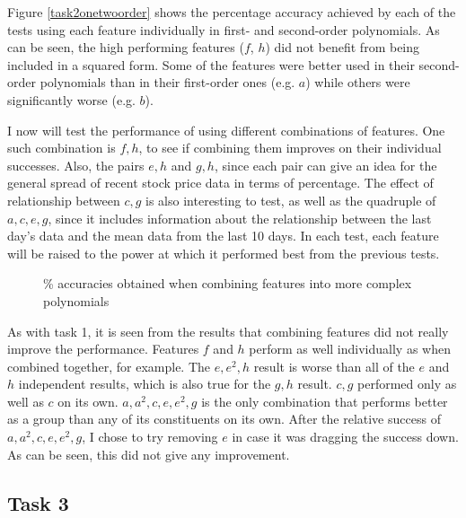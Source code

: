 \documentclass[a4paper,11pt]{article}
\begin{document}
Figure \ref{task2onetwoorder} shows the percentage accuracy achieved by each of the tests using each feature individually in first- and second-order polynomials.  As can be seen, the high performing features ($f$, $h$) did not benefit from being included in a squared form.  Some of the features were better used in their second-order polynomials than in their first-order ones (e.g. $a$) while others were significantly worse (e.g. $b$).

I now will test the performance of using different combinations of features.  One such combination is $f,h$, to see if combining them improves on their individual successes.  Also, the pairs $e,h$ and $g,h$, since each pair can give an idea for the general spread of recent stock price data in terms of percentage.  The effect of relationship between $c,g$ is also interesting to test, as well as the quadruple of $a,c,e,g$, since it includes information about the relationship between the last day's data and the mean data from the last 10 days.  In each test, each feature will be raised to the power at which it performed best from the previous tests.

\begin{figure}
\centering
\begin{bchart}[step=20,max=100]
		\smallskip
		\smallskip
		\smallskip
		\smallskip
		\smallskip
\end{bchart}
\caption{\% accuracies obtained when combining features into more complex polynomials}
\label{task2complex}
\end{figure}

As with task 1, it is seen from the results that combining features did not really improve the performance.  Features $f$ and $h$ perform as well individually as when combined together, for example.  The $e,e^2,h$ result is worse than all of the $e$ and $h$ independent results, which is also true for the $g,h$ result.  $c,g$ performed only as well as $c$ on its own.  $a,a^2,c,e,e^2,g$ is the only combination that performs better as a group than any of its constituents on its own.  After the relative success of $a,a^2,c,e,e^2,g$, I chose to try removing $e$ in case it was dragging the success down.  As can be seen, this did not give any improvement.

\subsection{Task 3}
\end{document}
